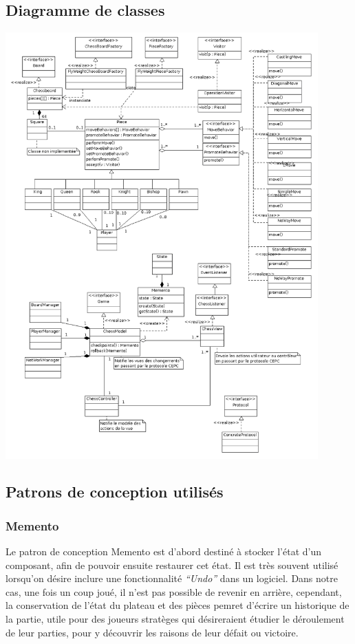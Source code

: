 \documentclass[11pt]{article}
\begin{document}
\subsection{Diagramme de classes}
\label{sec-3-2}
\includegraphics[width=0.9\textwidth]{Diagrammedeclasses.png}

\subsection{Patrons de conception utilisés}
\label{sec-3-3}
\subsubsection{Memento}
\label{sec-3-3-1}
Le patron de conception Memento est d'abord destiné à stocker l'état d'un composant, afin de pouvoir ensuite restaurer cet état. Il est très souvent utilisé lorsqu'on désire inclure une fonctionnalité \emph{``Undo''} dans un logiciel. Dans notre cas, une fois un coup joué, il n'est pas possible de revenir en arrière, cependant, la conservation de l'état du plateau et des pièces pemret d'écrire un historique de la partie, utile pour des joueurs stratèges qui désireraient étudier le déroulement de leur parties, pour y découvrir les raisons de leur défait ou victoire.
\end{document}
